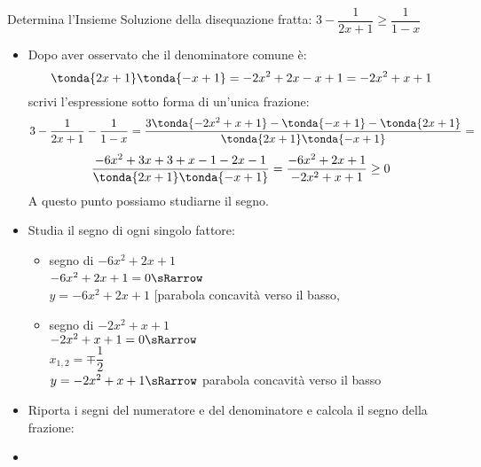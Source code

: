 \begin{esempio}
Determina l'Insieme Soluzione della disequazione fratta:\quad 
\(3-\dfrac{1}{2x+1} \ge \dfrac{1}{1-x}\)

\begin{itemize}

\item Dopo aver osservato che il denominatore comune è:
\[\tonda{2x+1}\tonda{-x+1} = -2x^2 +2x -x +1 = -2x^2 +x +1\]
scrivi l'espressione sotto forma di un'unica frazione:
\[3-\dfrac{1}{2x+1} - \dfrac{1}{1-x} =
  \dfrac{3 \tonda{-2x^2 +x +1} - \tonda{-x+1} - \tonda{2x+1}}
        {\tonda{2x+1}\tonda{-x+1}} =\]
\[\dfrac{-6x^2 +3x +3 +x-1 -2x-1}
        {\tonda{2x+1}\tonda{-x+1}} = 
  \dfrac{-6x^2 +2x +1}
        {-2x^2 +x +1} \ge 0\]
A questo punto possiamo studiarne il segno.

 \item Studia il segno di ogni singolo fattore:

\begin{itemize}

 \item  segno di \(-6x^2 +2x +1\)\\
 \segnofatt
   {\(-6x^2 +2x +1=0 \sRarrow\)}
   {\\ \(y=-6x^2 +2x +1\)}
   {[parabola concavità verso il basso, }
   {}
 \item segno di \(-2x^2 +x +1\)\\
 \segnofatt
   {\(-2x^2 +x +1=0 \sRarrow \) \\
  \(x_{1,2}=\mp\dfrac{1}{2}\)}
   {\\ \(y=-2x^2 +x +1 \sRarrow\)}
   {parabola concavità verso il basso}
   {\parabolaamidma{}{}}
\end{itemize}

 \item Riporta i segni del numeratore e del denominatore e calcola
il segno della frazione:

\begin{inaccessibleblock}
\vspace{2em}
  \begin{center}
  \segnofrazionec
  \end{center}
\end{inaccessibleblock}

 \item 
 \insiemesoluzione
   {}
   {}
   {}
\end{itemize}
\end{esempio}

